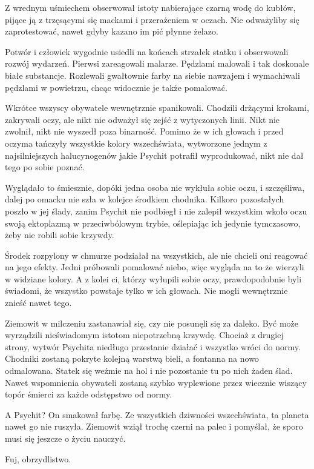 Z wrednym uśmiechem obserwował istoty nabierające czarną wodę do kubłów, pijące ją z trzęsącymi się mackami i przerażeniem w oczach.
Nie odważyliby się zaprotestować, nawet gdyby kazano im pić płynne żelazo.

\divider{}

Potwór i człowiek wygodnie usiedli na końcach strzałek statku i obserwowali rozwój wydarzeń.
Pierwsi zareagowali malarze. Pędzlami malowali i tak doskonale białe substancje. 
Rozlewali gwałtownie farby na siebie nawzajem i wymachiwali pędzlami w powietrzu, chcąc widocznie je także pomalować.

Wkrótce wszyscy obywatele wewnętrznie spanikowali. Chodzili drżącymi krokami, zakrywali oczy, ale nikt nie odważył się zejść z wytyczonych linii.
Nikt nie zwolnił, nikt nie wyszedł poza binarność.
Pomimo że w ich głowach i przed oczyma tańczyły wszystkie kolory wszechświata, wytworzone jednym z najsilniejszych halucynogenów
jakie Psychit potrafił wyprodukować, nikt nie dał tego po sobie poznać.

Wyglądało to śmiesznie, dopóki jedna osoba nie wykłuła sobie oczu, i szczęśliwa, dalej po omacku nie szła w kolejce środkiem chodnika.
Kilkoro pozostałych poszło w jej ślady, zanim Psychit nie podbiegł i nie zalepił wszystkim wkoło oczu swoją ektoplazmą w przeciwbólowym trybie, oślepiając ich jedynie tymczasowo, 
żeby nie robili sobie krzywdy.

Środek rozpylony w chmurze podziałał na wszystkich, ale nie chcieli oni reagować na jego efekty.
Jedni próbowali pomalować niebo, więc wygląda na to że wierzyli w widziane kolory.
A z kolei ci, którzy wyłupili sobie oczy, prawdopodobnie byli świadomi, że wszystko powstaje tylko w ich głowach.
Nie mogli wewnętrznie znieść nawet tego.

Ziemowit w milczeniu zastanawiał się, czy nie posunęli się za daleko.
Być może wyrządzili nieświadomym istotom niepotrzebną krzywdę.
Chociaż z drugiej strony, wytwór Psychita niedługo przestanie działać i wszystko wróci do normy.
Chodniki zostaną pokryte kolejną warstwą bieli, a fontanna na nowo odmalowana.
Statek się weźmie na hol i nie pozostanie tu po nich żaden ślad.
Nawet wspomnienia obywateli zostaną szybko wyplewione przez wiecznie wiszący topór śmierci za każde odstępstwo od normy.

A Psychit? On smakował farbę. 
Ze wszystkich dziwności wszechświata, ta planeta nawet go nie ruszyła.
Ziemowit wziął trochę czerni na palec i pomyślał, że sporo musi się jeszcze o życiu nauczyć.

Fuj, obrzydlistwo.







